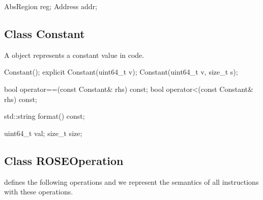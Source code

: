 \begin{apient}
AbsRegion reg;
Address addr;
\end{apient}

\subsection{Class Constant}


A  object represents a constant value in code.

\begin{apient}
Constant();
explicit Constant(uint64_t v);
Constant(uint64_t v, size_t s);
\end{apient}

\begin{apient}
bool operator==(const Constant& rhs) const;
bool operator<(const Constant& rhs) const;
\end{apient}

\begin{apient}
std::string format() const;
\end{apient}

\begin{apient}
uint64_t val;
size_t size;
\end{apient}

\subsection{Class ROSEOperation}


 defines the following operations and we represent the
semantics of all instructions with these operations.


